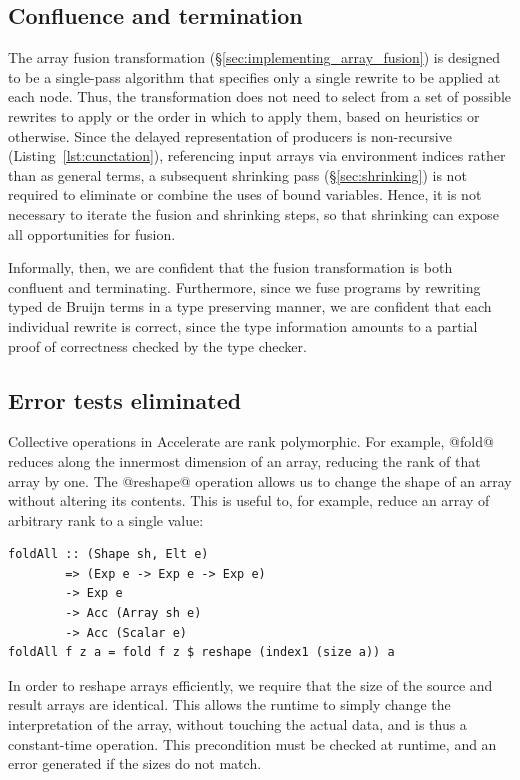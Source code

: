 \subsection{Confluence and termination}

The array fusion transformation (\S\ref{sec:implementing_array_fusion}) is
designed to be a single-pass algorithm that specifies only a single rewrite to
be applied at each node. Thus, the transformation does not need to select from a
set of possible rewrites to apply or the order in which to apply them, based on
heuristics or otherwise. Since the delayed representation of producers is
non-recursive (Listing~\ref{lst:cunctation}), referencing input arrays via
environment indices rather than as general terms, a subsequent shrinking pass
(\S\ref{sec:shrinking}) is not required to eliminate or combine the uses of
bound variables. Hence, it is not necessary to iterate the fusion and shrinking
steps, so that shrinking can expose all opportunities for fusion.

Informally, then, we are confident that the fusion transformation is both
confluent and terminating. Furthermore, since we fuse programs by rewriting
typed de Bruijn terms in a type preserving manner, we are confident that each
individual rewrite is correct, since the type information amounts to a partial
proof of correctness checked by the type checker.


\subsection{Error tests eliminated}

Collective operations in Accelerate are rank polymorphic. For example, @fold@
reduces along the innermost dimension of an array, reducing the rank of that
array by one. The @reshape@ operation allows us to change the shape of an array
without altering its contents. This is useful to, for example, reduce an array
of arbitrary rank to a single value:
%
\begin{lstlisting}[style=haskell]
foldAll :: (Shape sh, Elt e)
        => (Exp e -> Exp e -> Exp e)
        -> Exp e
        -> Acc (Array sh e)
        -> Acc (Scalar e)
foldAll f z a = fold f z $ reshape (index1 (size a)) a
\end{lstlisting}
%
In order to reshape arrays efficiently, we require that the size of the source
and result arrays are identical. This allows the runtime to simply change the
interpretation of the array, without touching the actual data, and is thus a
constant-time operation. This precondition must be checked at runtime, and an
error generated if the sizes do not match.


